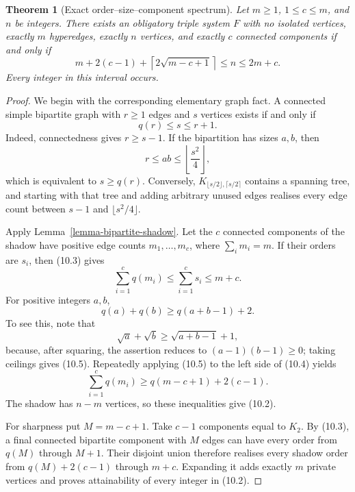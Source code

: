 \documentclass[a4paper,11pt,reqno]{amsart}
\theoremstyle{plain}
\newtheorem{theorem}{Theorem}[section]
\theoremstyle{definition}
\theoremstyle{remark}
\begin{document}
\begin{theorem}[Exact order--size--component spectrum]
\label{theorem-order-size-component-spectrum}
Let $m\ge1$, $1\le c\le m$, and $n$ be integers.  There exists an obligatory
triple system $F$ with no isolated vertices, exactly $m$ hyperedges, exactly
$n$ vertices, and exactly $c$ connected components if and only if
\[
\boxed{
 m+2(c-1)+\left\lceil2\sqrt{m-c+1}\right\rceil
 \le n\le 2m+c.
}
\tag{10.2}
\]
Every integer in this interval occurs.
\end{theorem}
\begin{proof}
We begin with the corresponding elementary graph fact.  A connected simple
bipartite graph with $r\ge1$ edges and $s$ vertices exists if and only if
\[
q(r)\le s\le r+1.
\tag{10.3}
\]
Indeed, connectedness gives $r\ge s-1$.  If the bipartition has sizes $a,b$,
then
\[
r\le ab\le\left\lfloor\frac{s^2}{4}\right\rfloor,
\]
which is equivalent to $s\ge q(r)$.  Conversely,
$K_{\lfloor s/2\rfloor,\lceil s/2\rceil}$ contains a spanning tree, and
starting with that tree and adding arbitrary unused edges realises every edge
count between $s-1$ and $\lfloor s^2/4\rfloor$.

Apply Lemma~\ref{lemma-bipartite-shadow}.  Let the $c$ connected components of
the shadow have positive edge counts $m_1,\ldots,m_c$, where
$\sum_i m_i=m$.  If their orders are $s_i$, then (10.3) gives
\[
\sum_{i=1}^c q(m_i)\le \sum_{i=1}^c s_i\le m+c.
\tag{10.4}
\]
For positive integers $a,b$,
\[
q(a)+q(b)\ge q(a+b-1)+2.
\tag{10.5}
\]
To see this, note that
\[
\sqrt a+\sqrt b\ge\sqrt{a+b-1}+1,
\]
because, after squaring, the assertion reduces to
$(a-1)(b-1)\ge0$; taking ceilings gives (10.5).  Repeatedly
applying (10.5) to the left side of (10.4) yields
\[
\sum_{i=1}^c q(m_i)
\ge q(m-c+1)+2(c-1).
\]
The shadow has $n-m$ vertices, so these inequalities give (10.2).

For sharpness put $M=m-c+1$.  Take $c-1$ components equal to $K_2$.  By
(10.3), a final connected bipartite component with $M$ edges can have every
order from $q(M)$ through $M+1$.  Their disjoint union therefore realises
every shadow order from $q(M)+2(c-1)$ through $m+c$.  Expanding it adds
exactly $m$ private vertices and proves attainability of every integer in
(10.2).
\end{proof}
\end{document}

